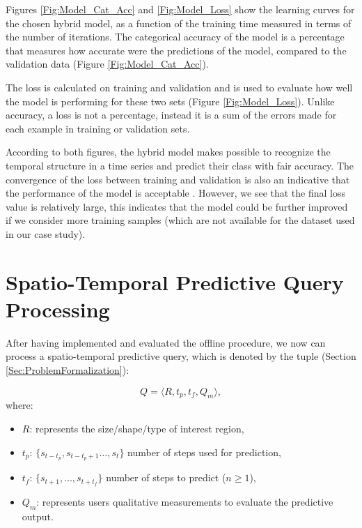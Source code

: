 Figures \ref{Fig:Model_Cat_Acc} and \ref{Fig:Model_Loss} show the learning curves for the chosen hybrid model, as a function of the training time measured in terms of the number of iterations. The categorical accuracy of the model is a percentage that measures how accurate were the predictions of the model, compared to the validation data (Figure \ref{Fig:Model_Cat_Acc}).  

The loss is calculated on training and validation and is used to evaluate how well the model is performing for these two sets (Figure \ref{Fig:Model_Loss}). Unlike accuracy, a loss is not a percentage, instead it is a sum of the errors made for each example in training or validation sets.

According to both figures, the hybrid model makes possible to recognize the temporal structure in a time series and predict their class with fair accuracy. The convergence of the loss between training and validation is also an indicative that the performance of the model is acceptable \cite{Charniak2019}. However, we see that the final loss value is relatively large, this indicates that the model could be further improved if we consider more training samples (which are not available for the dataset used in our case study).

\section{Spatio-Temporal Predictive Query Processing}
\label{Sec:SpatioTemporalPredictiveQuery}

After having implemented and evaluated the offline procedure, we now can process a spatio-temporal predictive query, which is denoted by the tuple (Section \ref{Sec:ProblemFormalization}):

\begin{equation*} 
Q = \langle R, t_{p}, t_{f}, Q_{m} \rangle,
\end{equation*}
where:
\begin{itemize}[noitemsep,nolistsep]	
	\item $R$: represents the size/shape/type of interest region,
	\item $t_{p}$: $\{s_{t-t_p}, s_{t-t_{p}+1}\ldots, s_{t}\}$ number of steps used for  prediction,
	\item $t_{f}$: $\{s_{t+1}, \ldots, s_{t+t_f}\}$ number of steps to predict ($n\geq 1$),
	\item $Q_{m}$: represents users qualitative measurements to evaluate the predictive output.
\end{itemize}

